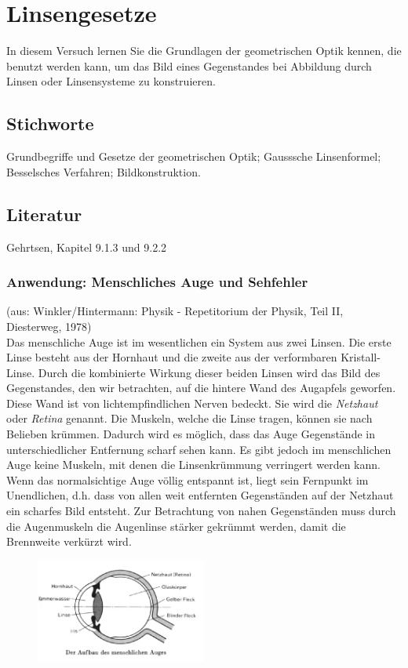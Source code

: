 \chapter{Linsengesetze}
\label{v:7}

In diesem Versuch lernen Sie die Grundlagen der geometrischen Optik kennen, die benutzt werden kann, um das Bild eines Gegenstandes bei Abbildung durch Linsen oder Linsensysteme zu konstruieren.

\section{Stichworte}
Grundbegriffe und Gesetze der geometrischen Optik; Gausssche Linsenformel; Besselsches Verfahren; Bildkonstruktion.
%
\section{Literatur}
Gehrtsen, Kapitel 9.1.3 und 9.2.2
%

\subsection{Anwendung: Menschliches Auge und Sehfehler}

(aus: Winkler/Hintermann: Physik - Repetitorium der Physik, Teil II, Diesterweg, 1978)\\

\noindent
Das menschliche Auge ist im wesentlichen ein System aus zwei Linsen. Die erste Linse besteht aus der Hornhaut und die zweite aus der verformbaren Kristall-Linse. Durch die kombinierte Wirkung dieser beiden Linsen wird das Bild des Gegenstandes, den wir betrachten, auf die hintere Wand des Augapfels geworfen. Diese Wand ist von lichtempfindlichen Nerven bedeckt. Sie wird die \textit{Netzhaut} oder \textit{Retina} genannt. Die Muskeln, welche die Linse tragen, können sie nach Belieben krümmen. Dadurch wird es möglich, dass das Auge Gegenstände in unterschiedlicher Entfernung scharf sehen kann. Es gibt jedoch im menschlichen Auge keine Muskeln, mit denen die Linsenkrümmung verringert werden kann. Wenn das normalsichtige Auge völlig entspannt ist, liegt sein Fernpunkt im Unendlichen, d.h. dass von allen weit entfernten Gegenständen auf der Netzhaut ein scharfes Bild entsteht. Zur Betrachtung von nahen Gegenständen muss durch die Augenmuskeln die Augenlinse stärker gekrümmt werden, damit die Brennweite verkürzt 
wird.
\begin{figure}[h]
	\centering
		\includegraphics[width=0.5\textwidth]{Abbildungen/auge.jpg}
	\label{fig:auge}
\end{figure}


